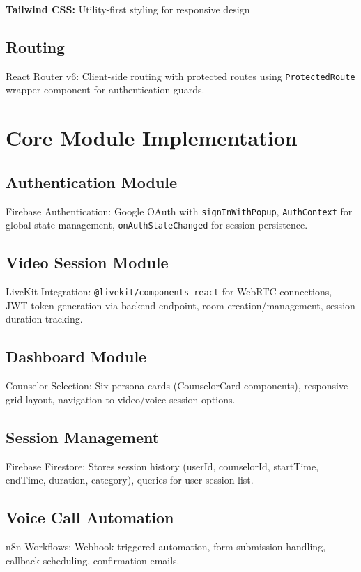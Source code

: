 \documentclass[11pt,a4paper]{report}
\begin{document}
\textbf{Tailwind CSS:} Utility-first styling for responsive design

\subsection{Routing}
React Router v6: Client-side routing with protected routes using \texttt{ProtectedRoute} wrapper component for authentication guards.

\section{Core Module Implementation}

\subsection{Authentication Module}
Firebase Authentication: Google OAuth with \texttt{signInWithPopup}, \texttt{AuthContext} for global state management, \texttt{onAuthStateChanged} for session persistence.

\subsection{Video Session Module}
LiveKit Integration: \texttt{@livekit/components-react} for WebRTC connections, JWT token generation via backend endpoint, room creation/management, session duration tracking.

\subsection{Dashboard Module}
Counselor Selection: Six persona cards (CounselorCard components), responsive grid layout, navigation to video/voice session options.

\subsection{Session Management}
Firebase Firestore: Stores session history (userId, counselorId, startTime, endTime, duration, category), queries for user session list.

\subsection{Voice Call Automation}
n8n Workflows: Webhook-triggered automation, form submission handling, callback scheduling, confirmation emails.
\end{document}
